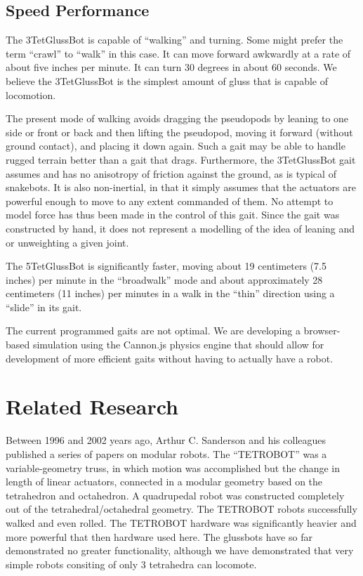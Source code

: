 \documentclass[11pt]{article}
\begin{document}
\subsection{Speed Performance}

The 3TetGlussBot is capable of ``walking'' and turning. Some might prefer the term ``crawl'' to ``walk'' in
this case. It can move forward awkwardly at a rate
of about five inches per minute. It can turn 30 degrees in about 60 seconds.
We believe the 3TetGlussBot is the simplest amount of gluss that is capable of locomotion.

The present mode of walking avoids dragging the pseudopods by leaning to one side or front or back and
then lifting the pseudopod, moving it forward (without ground contact), and placing it down again.
Such a gait may be able to handle rugged terrain better than a gait that drags. Furthermore, the
3TetGlussBot gait assumes and has no anisotropy of friction against the ground, as is typical
of snakebots.
It is also non-inertial, in that it simply assumes that the actuators are powerful enough to
move to any extent commanded of them. No attempt to model force has thus been made in the control of this gait.
Since the gait was constructed by hand, it does not represent a modelling of the idea of leaning and or
unweighting a given joint.

The 5TetGlussBot is significantly faster, moving about 19 centimeters (7.5 inches)
per minute in the ``broadwalk'' mode
and about approximately 28 centimeters (11 inches) per minutes in a walk in the
``thin'' direction using a ``slide'' in its gait.

The current programmed gaits are not optimal.
We are developing a browser-based simulation using the Cannon.js physics engine that should allow for development
of more efficient gaits without having to actually have a robot.

\section{Related Research}

Between 1996 and 2002 years ago, Arthur C. Sanderson and his colleagues published a series of
papers\cite{sanderson1996modular,lee2002dynamic,lee1999dynamics} on modular robots.
The ``TETROBOT'' was a variable-geometry truss, in which motion was accomplished but the change
in length of linear actuators, connected in a modular geometry based on the tetrahedron and octahedron.
A quadrupedal robot was constructed completely out of the tetrahedral/octahedral geometry.
The TETROBOT robots successfully walked and even rolled. The TETROBOT hardware was significantly
heavier and more powerful that then hardware used here. The glussbots have so far demonstrated no greater functionality,
although we have demonstrated that very simple robots consiting of only 3 tetrahedra can locomote.
\end{document}
